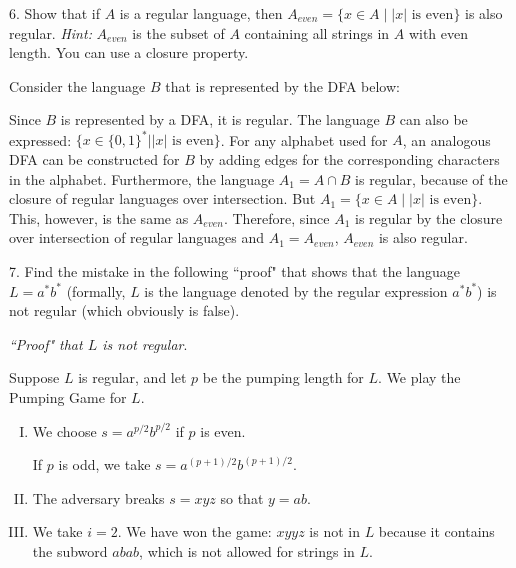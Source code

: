 \documentclass[12pt,letterpaper,final]{report}
\begin{document}
6. Show that if $A$ is a regular language, then $A_{even} = \{x \in A \mid |x| \textrm{ is even} \}$ is also regular. \emph{Hint:} $A_{even}$ is the subset of $A$ containing all strings in $A$ with even length. You can use a closure property.

Consider the language $B$ that is represented by the DFA below:

\begin{center}
\end{center}

Since $B$ is represented by a DFA, it is regular. The language $B$ can also be expressed: $\{x \in {\{0,1\}}^* \mid \vert x \vert \text{ is even}\}$. For any alphabet used for $A$, an analogous DFA can be constructed for $B$ by adding edges for the corresponding characters in the alphabet. Furthermore, the language $A_1 = A \cap B$ is regular, because of the closure of regular languages over intersection. But $A_1 = \{x \in A \mid |x| \text{ is even} \}$. This, however, is the same as $A_{even}$. Therefore, since $A_1$ is regular by the closure over intersection of regular languages and $A_1 = A_{even}$, $A_{even}$ is also regular.

\bigskip



\pagebreak

7.  Find the mistake in the following ``proof" that shows that the language $L = a^* b^*$ (formally, $L$ is the language denoted by the regular expression $a^* b^*$) is not regular (which obviously is false).
\medskip

\emph{``Proof" that $L$ is not regular}.

Suppose $L$ is regular, and let $p$ be the pumping length for $L$. We play the Pumping Game for $L$.
\medskip

\begin{enumerate}[I.]
  \item We choose $s = a^{p/2} b^{p/2}$ if $p$ is even.

        If $p$ is odd, we take $s = a^{(p+1)/2} b^{(p+1)/2}$.
  \item The adversary breaks $s = xyz$ so that $y = ab$.
  \item We take $i = 2$. We have won the game: $xyyz$ is not in $L$ because
        it contains the subword $abab$, which is not allowed for strings in $L$.
\end{enumerate}
\end{document}
